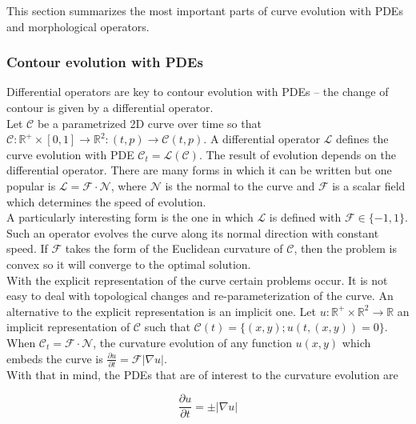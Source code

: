 This section summarizes the most important parts of curve evolution with PDEs and morphological operators.




\subsubsection{Contour evolution with PDEs}

Differential operators are key to contour evolution with PDEs -- the change of contour is given by a differential operator. \\

Let $\mathcal{C}$ be a parametrized 2D curve over time so that $\mathcal{C}: \mathbb{R}^+ \times [0,1] \rightarrow \mathbb{R}^2 : (t,p) \rightarrow \mathcal{C}(t,p)$. A differential operator $\mathcal{L}$ defines the curve evolution with PDE $\mathcal{C}_t = \mathcal{L}(\mathcal{C})$. The result of evolution depends on the differential operator. There are many forms in which it can be written but one popular is $\mathcal{L} = \mathcal{F} \cdot \mathcal{N}$, where $\mathcal{N}$ is the normal to the curve and $\mathcal{F}$ is a scalar field which determines the speed of evolution. \\

A particularly interesting form is the one in which $\mathcal{L}$ is defined with $\mathcal{F} \in \{ -1,1 \}$. Such an operator evolves the curve along its normal direction with constant speed. If $\mathcal{F}$ takes the form of the Euclidean curvature of $\mathcal{C}$, then the problem is convex so it will converge to the optimal solution. \\

With the explicit representation of the curve certain problems occur. It is not easy to deal with topological changes and re-parameterization of the curve. An alternative to the explicit representation is an implicit one. Let $u: \mathbb{R}^+ \times \mathbb{R}^2 \rightarrow \mathbb{R}$ an implicit representation of $\mathcal{C}$ such that $\mathcal{C}(t) = \{ (x,y); u(t,(x,y)) = 0 \}$. When $\mathcal{C}_t = \mathcal{F} \cdot \mathcal{N}$, the curvature evolution of any function $u(x,y)$ which embeds the curve is $\frac{\partial u}{\partial t} = \mathcal{F}|\nabla u|$. \\

With that in mind, the PDEs that are of interest to the curvature evolution are

\begin{equation}
	\frac{\partial u}{\partial t} = \pm |\nabla u|
	\label{eq:PDE1}
\end{equation}

